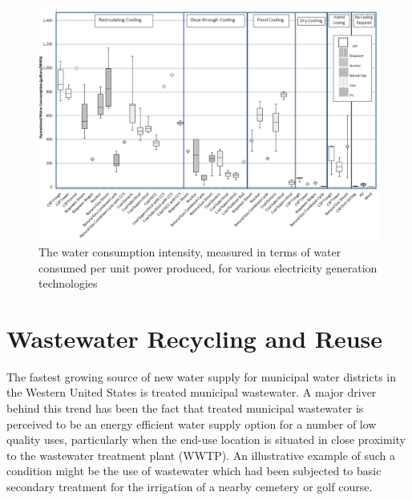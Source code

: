        \begin{figure}[Water consumed per unit power production for various electricity generation technologies]
       \centering
       \includegraphics[width=5.5in]{figures/water_consumption_for_energy.png}
       \caption[Water Intensity of Energy Production]{The water consumption intensity, measured in terms of water consumed per unit power produced, for various electricity generation technologies}
       \label{fig:water-consumption-intensity}
        \end{figure}
    
\section{Wastewater Recycling and Reuse}
    
The fastest growing source of new water supply for municipal water districts in the Western United States is treated municipal wastewater. A major driver behind this trend has been the fact that treated municipal wastewater is perceived to be an energy efficient water supply option for a number of low quality uses, particularly when the end-use location is situated in close proximity to the wastewater treatment plant (WWTP). An illustrative example of such a condition might be the use of wastewater which had been subjected to basic secondary treatment for the irrigation of a nearby cemetery or golf course.
    
